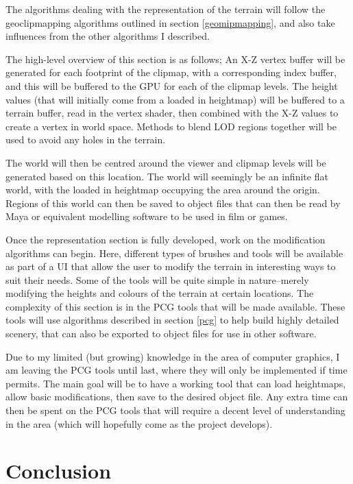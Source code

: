 \documentclass[notitlepage,12pt]{article}
\begin{document}
The algorithms dealing with the representation of the terrain will follow the geoclipmapping algorithms outlined in section \ref{geomipmapping}, and also take influences from the other algorithms I described. 

The high-level overview of this section is as follows; An X-Z vertex buffer will be generated for each footprint of the clipmap, with a corresponding index buffer, and this will be buffered to the GPU for each of the clipmap levels. The height values (that will initially come from a loaded in heightmap) will be buffered to a terrain buffer, read in the vertex shader, then combined with the X-Z values to create a vertex in world space. Methods to blend LOD regions together will be used to avoid any holes in the terrain.

The world will then be centred around the viewer and clipmap levels will be generated based on this location. The world will seemingly be an infinite flat world, with the loaded in heightmap occupying the area around the origin. Regions of this world can then be saved to object files that can then be read by Maya or equivalent modelling software to be used in film or games.

Once the representation section is fully developed, work on the modification algorithms can begin. Here, different types of brushes and tools will be available as part of a UI that allow the user to modify the terrain in interesting ways to suit their needs. Some of the tools will be quite simple in nature--merely modifying the heights and colours of the terrain at certain locations. The complexity of this section is in the PCG tools that will be made available. These tools will use algorithms described in section \ref{pcg} to help build highly detailed scenery, that can also be exported to object files for use in other software.

Due to my limited (but growing) knowledge in the area of computer graphics, I am leaving the PCG tools until last, where they will only be implemented if time permits. The main goal will be to have a working tool that can load heightmaps, allow basic modifications, then save to the desired object file. Any extra time can then be spent on the PCG tools that will require a decent level of understanding in the area (which will hopefully come as the project develops).

\section{Conclusion}






\clearpage


\end{document}
